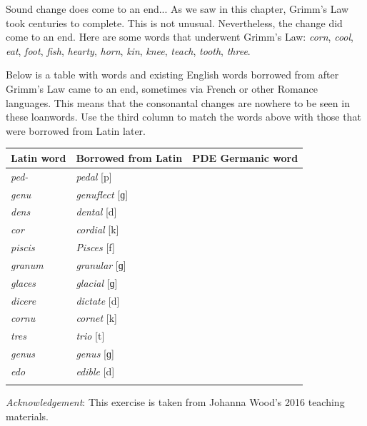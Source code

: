 \begin{exercises}{Sound change does come to an end...}\label{exercise-grimm}
As we saw in this chapter, Grimm's Law took centuries to complete. This is not unusual. Nevertheless, the change did come to an end. Here are some words that underwent Grimm's Law: \emph{corn}, \emph{cool}, \emph{eat}, \emph{foot}, \emph{fish}, \emph{hearty}, \emph{horn}, \emph{kin}, \emph{knee}, \emph{teach}, \emph{tooth}, \emph{three}.

Below is a table with  words and existing English words borrowed from  after Grimm's Law came to an end, sometimes via French or other Romance languages. This means that the consonantal changes are nowhere to be seen in these loanwords. Use the third column to match the words above with those that were borrowed from Latin later.

\begin{table}[H]
        \begin{tabular}{lll}
        \lsptoprule
    Latin word  & Borrowed from Latin & PDE Germanic word \\
    \midrule
    \emph{ped-} & \emph{pedal} [p] & \\
    \emph{genu} & \emph{genuflect} [ɡ] & \\
    \emph{dens} & \emph{dental} [d] & \\
    \emph{cor} & \emph{cordial} [k] & \\
    \emph{piscis} & \emph{Pisces} [f] & \\
    \emph{granum} & \emph{granular} [ɡ] & \\
    \emph{glaces} & \emph{glacial} [ɡ] & \\
    \emph{dicere} & \emph{dictate} [d] & \\
    \emph{cornu} & \emph{cornet} [k] & \\
    \emph{tres} & \emph{trio} [t] & \\
    \emph{genus} & \emph{genus} [ɡ] & \\
    \emph{edo} & \emph{edible} [d] & \\
    \lspbottomrule
    \end{tabular}
    \label{tab:GL-exercise}
\end{table}

\noindent \emph{Acknowledgement}: This exercise is taken from Johanna Wood's 2016 teaching materials.

\end{exercises}

